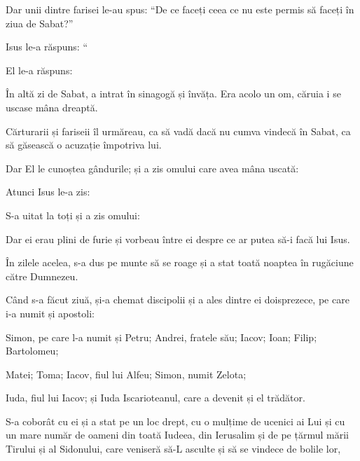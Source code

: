 {Dar unii dintre farisei le-au spus: “De ce faceți ceea ce nu este permis să faceți în ziua de Sabat?”


\par }{\PP {}Isus le-a răspuns: “{}


El le-a răspuns:
{}


\par }{\PP {}În altă zi de Sabat, a intrat în sinagogă și învăța. Era acolo un om, căruia i se uscase mâna dreaptă.

Cărturarii și fariseii îl urmăreau, ca să vadă dacă nu cumva vindecă în Sabat, ca să găsească o acuzație împotriva lui.

Dar El le cunoștea gândurile; și a zis omului care avea mâna uscată:
{}

Atunci Isus le-a zis:
{}

S-a uitat la toți și a zis omului:
{}

Dar ei erau plini de furie și vorbeau între ei despre ce ar putea să-i facă lui Isus.


\par }{\PP {}În zilele acelea, s-a dus pe munte să se roage și a stat toată noaptea în rugăciune către Dumnezeu.

Când s-a făcut ziuă, și-a chemat discipolii și a ales dintre ei doisprezece, pe care i-a numit și apostoli:

Simon, pe care l-a numit și Petru; Andrei, fratele său; Iacov; Ioan; Filip; Bartolomeu;

Matei; Toma; Iacov, fiul lui Alfeu; Simon, numit Zelota;

Iuda, fiul lui Iacov; și Iuda Iscarioteanul, care a devenit și el trădător.


\par }{\PP {}S-a coborât cu ei și a stat pe un loc drept, cu o mulțime de ucenici ai Lui și cu un mare număr de oameni din toată Iudeea, din Ierusalim și de pe țărmul mării Tirului și al Sidonului, care veniseră să-L asculte și să se vindece de bolile lor,

}
